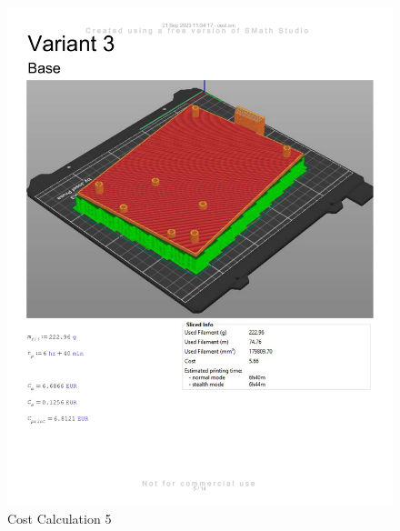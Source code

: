 \begin{figure}[H]
    \centering
    \includegraphics[width=\linewidth]{texs/appendix/data/cost1-05.jpg}
    \caption{Cost Calculation 5}
    \label{fig:cost-calculation-5}
\end{figure}

